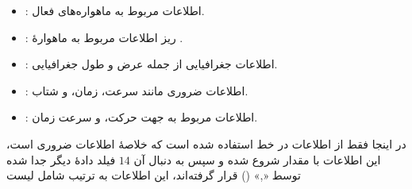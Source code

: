 \begin{itemize}[nosep]
    \item {}: اطلاعات مربوط به ماهواره‌های فعال.
    \item {}: ریز اطلاعات مربوط به ماهوارهٔ .
    \item {}: اطلاعات جغرافیایی از جمله عرض و طول جغرافیایی.
    \item {}: اطلاعات ضروری مانند سرعت، زمان، و شتاب.
    \item {}: اطلاعات مربوط به جهت حرکت، و سرعت زمان.
\end{itemize}

در اینجا فقط از اطلاعات در خط  استفاده شده است که خلاصهٔ اطلاعات ضروری  است، این اطلاعات با مقدار  شروع شده و سپس به دنبال آن $14$ فیلد دادهٔ دیگر جدا شده توسط «,» () قرار گرفته‌اند، این اطلاعات به ترتیب شامل لیست

